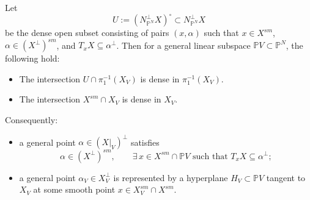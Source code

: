 \documentclass[10pt,a4paper]{amsart}
\begin{document}
\begin{lemma}\label{lemma_generalityV}
Let
\[
U:=(N_{\mathbb P^N}^{\perp}X)^\circ
\subset N_{\mathbb P^N}^{\perp}X
\]
be the dense open subset consisting of pairs $(x,\alpha)$ such that
$x\in X^{sm}$, $\alpha\in (X^\perp)^{sm}$, and $T_xX\subseteq \alpha^\perp$.
Then for a general linear subspace $\mathbb PV\subset \mathbb P^N$, the following hold:

\begin{itemize}
\item[(1)] The intersection
$U\cap \pi_1^{-1}(X_V)$
is dense in $\pi_1^{-1}(X_V)$.

\item[(2)] The intersection
$X^{sm}\cap X_V$
is dense in $X_V$.
\end{itemize}

Consequently:

\begin{itemize}
\item[(i)] a general point $\alpha\in (X|_V)^\perp$ satisfies
\[
\alpha\in (X^\perp)^{sm},
\qquad
\exists\, x\in X^{sm}\cap \mathbb PV
\text{ such that } T_xX\subseteq \alpha^\perp;
\]

\item[(ii)] a general point $\alpha_V\in X_V^\perp$ is represented by a hyperplane
$H_V\subset \mathbb PV$ tangent to $X_V$ at some smooth point 
$x\in X_V^{sm}\cap X^{sm}$.
\end{itemize}
\end{lemma}
\end{document}
